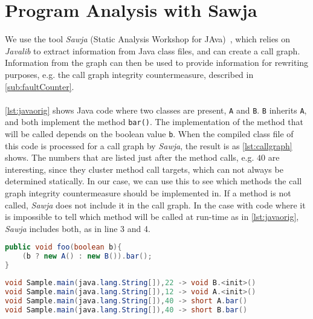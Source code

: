 \section{Program Analysis with Sawja}\label{sec:sawja}
We use the tool \textit{Sawja} (Static Analysis Workshop for JAva)~\cite{sawja}, which relies on \textit{Javalib} to extract information from Java class files, and can create a call graph. Information from the graph can then be used to provide information for rewriting purposes, e.g. the call graph integrity countermeasure, described in \cref{sub:faultCounter}.\\\\
\cref{lst:javaorig} shows Java code where two classes are present, \texttt{A} and \texttt{B}. \texttt{B} inherits \texttt{A}, and both implement the method \texttt{bar()}. The implementation of the method that will be called depends on the boolean value \texttt{b}. When the compiled class file of this code is processed for a call graph by \textit{Sawja}, the result is as \cref{lst:callgraph} shows. The numbers that are listed just after the method calls, e.g. $40$ are interesting, since they cluster method call targets, which can not always be determined statically. In our case, we can use this to see which methods the call graph integrity countermeasure should be implemented in. If a method is not called, \textit{Sawja} does not include it in the call graph.
In the case with code where it is impossible to tell which method will be called at run-time as in \cref{lst:javaorig}, \textit{Sawja} includes both, as in line 3 and 4.

\begin{minipage}{\linewidth}
\begin{lstlisting}[caption=Java sample.,language=Java,label=lst:javaorig]
public void foo(boolean b){
    (b ? new A() : new B()).bar();
}
\end{lstlisting}
\end{minipage}

\begin{minipage}{\linewidth} %
\begin{lstlisting}[caption=Call graph generated by \textit{Sawja}.,language=Java,label=lst:callgraph]
void Sample.main(java.lang.String[]),22 -> void B.<init>()
void Sample.main(java.lang.String[]),12 -> void A.<init>()
void Sample.main(java.lang.String[]),40 -> short A.bar()
void Sample.main(java.lang.String[]),40 -> short B.bar()
\end{lstlisting}
\end{minipage}

